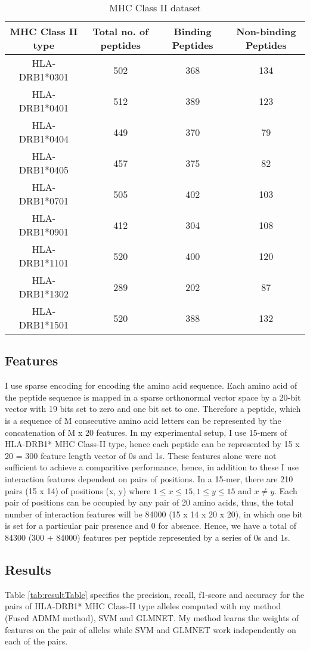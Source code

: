 \documentclass[conference,10pt,draftclsnofoot,onecolumn]{IEEEtran}
\begin{document}
\begin{table}[!t]
\caption{MHC Class II dataset}
\label{tab:dataset}
\centering
\begin{tabular}{|c||c||c||c|}
\hline
MHC Class II type & Total no. of peptides & Binding Peptides & Non-binding Peptides\\
\hline
HLA-DRB1*0301 & 502 & 368 & 134\\
\hline
HLA-DRB1*0401 & 512 & 389 & 123\\
\hline
HLA-DRB1*0404 & 449 & 370 & 79\\
\hline
HLA-DRB1*0405 & 457 & 375 & 82\\
\hline
HLA-DRB1*0701 & 505 & 402 & 103\\
\hline
HLA-DRB1*0901 & 412 & 304 & 108\\
\hline
HLA-DRB1*1101 & 520 & 400 & 120\\
\hline
HLA-DRB1*1302 & 289 & 202 & 87\\
\hline
HLA-DRB1*1501 & 520 & 388 & 132\\
\hline
\end{tabular}
\end{table}

\subsection{Features}
\label{subsec:features}
I use sparse encoding \cite{qian88} for encoding the amino acid sequence. Each amino acid of the peptide sequence is mapped in a sparse orthonormal vector space by a 20-bit vector with 19 bits set to zero and one bit set to one. Therefore a peptide, which is a sequence of M consecutive amino acid letters can be represented by the concatenation of M x 20 features. In my experimental setup, I use 15-mers of HLA-DRB1* MHC Class-II type, hence each peptide can be represented by 15 x 20 = 300 feature length vector of 0s and 1s. These features alone were not sufficient to achieve a comparitive performance, hence, in addition to these I use interaction features dependent on pairs of positions. In a 15-mer, there are 210 pairs (15 x 14) of positions (x, y) where $1 \le x \le 15, 1 \le y \le 15$ and $x \ne y$. Each pair of positions can be occupied by any pair of 20 amino acids, thus, the total number of interaction features will be 84000 (15 x 14 x 20 x 20), in which one bit is set for a particular pair presence and 0 for absence. Hence, we have a total of 84300 (300 + 84000) features per peptide represented by a series of 0s and 1s.

\subsection{Results}
\label{subsec:results}
Table \ref{tab:resultTable} specifies the precision, recall, f1-score and accuracy for the pairs of HLA-DRB1* MHC Class-II type alleles computed with my method (Fused ADMM method), SVM and GLMNET. My method learns the weights of features on the pair of alleles while SVM and GLMNET work independently on each of the pairs.
\end{document}
